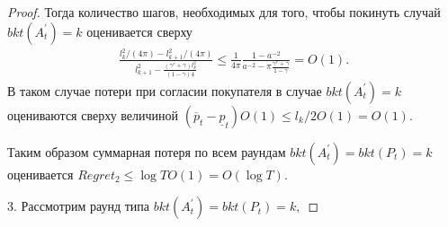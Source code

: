\documentclass[12 pt, russian]{article}
\begin{document}
\begin{proof}
Тогда количество шагов, необходимых для того, чтобы покинуть случай $bkt(A^{'}_t) = k$ оценивается сверху
\begin{gather*}
    \frac{l^2_k / (4 \pi) - l^2_{k + 1} / (4 \pi)}{l^2_{k + 1} - \frac{(\gamma^r + \gamma) l^2_k}{(1 - \gamma) 4}} \leq \frac{1}{4 \pi} \frac{1 - a^{-2}}{a^{-2} - \pi \frac{\gamma^r + \gamma}{1 - \gamma}} = O(1).
\end{gather*}
В таком случае потери при согласии покупателя в случае $bkt(A^{'}_t) = k$  оцениваются сверху величиной $(\overline{p}_t - \underline{p}_t) O(1) \leq l_k / 2 O(1) = O(1).$

Таким образом суммарная потеря по всем раундам $bkt(A^{'}_t) = bkt(P_t) = k$ оценивается $Regret_2 \leq \log{T} O(1) = O(\log{T}).$

3. Рассмотрим раунд типа $bkt(A^{'}_t) = bkt(P_t) = k,$
\end{proof}
\end{document}
